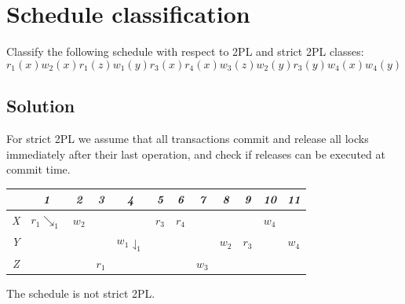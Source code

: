 \documentclass[12pt, a4paper]{report}
\begin{document}
    \newpage

    \section{Schedule classification}
        Classify the following schedule with respect to 2PL and strict 2PL classes: 
        \[r_1(x) w_2(x) r_1(z) w_1(y) r_3(x) r_4(x) w_3(z) w_2(y) r_3(y) w_4(x) w_4(y)\]
    \subsection*{Solution}
        For strict 2PL we assume that all transactions commit and release all locks immediately after their last operation, and check if releases can be executed at commit time.
        \begin{table}[H]
            \centering
            \begin{tabular}{c|ccccccccccc}
                       & \textit{1} & \textit{2} & \textit{3} & \textit{4} & \textit{5} & \textit{6} & \textit{7} & \textit{8} & \textit{9} & \textit{10} & \textit{11}          \\ \hline
            \textit{X} & $r_1\searrow_1$       & $w_2$      &            &                                  & $r_3$      & $r_4$      &            &            &            & $w_4$       &                    \\
            \textit{Y} &                       &            &            & $w_1\downharpoonleft_1$          &            &            &            & $w_2$      & $r_3$      &             & $w_4$                \\
            \textit{Z} &                       &            & $r_1$      &                                  &            &            & $w_3$      &            &            &             &                     
            \end{tabular}%
        \end{table}
        The schedule is not strict 2PL.
\end{document}
